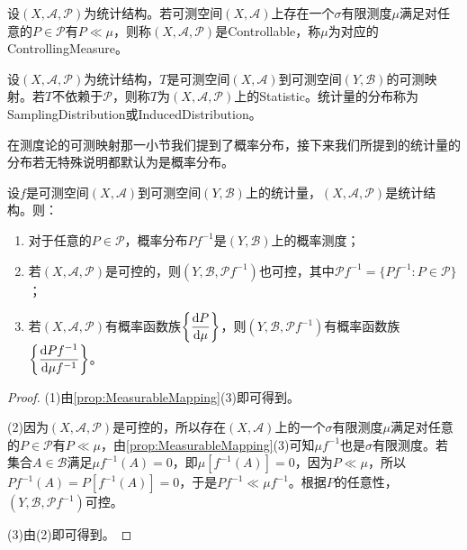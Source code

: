\begin{definition}
	设$(X,\mathscr{A},\mathscr{P})$为统计结构。若可测空间$(X,\mathscr{A})$上存在一个$\sigma$有限测度$\mu$满足对任意的$P\in\mathscr{P}$有$P\ll\mu$，则称$(X,\mathscr{A},\mathscr{P})$是\gls{Controllable}，称$\mu$为对应的\gls{ControllingMeasure}。
\end{definition}
\begin{definition}
	设$(X,\mathscr{A},\mathscr{P})$为统计结构，$T$是可测空间$(X,\mathscr{A})$到可测空间$(Y,\mathscr{B})$的可测映射。若$T$不依赖于$\mathscr{P}$，则称$T$为$(X,\mathscr{A},\mathscr{P})$上的\gls{Statistic}。统计量的分布称为\gls{SamplingDistribution}或\gls{InducedDistribution}。
\end{definition}
在测度论的可测映射那一小节我们提到了概率分布，接下来我们所提到的统计量的分布若无特殊说明都默认为是概率分布。
\begin{property}
	设$f$是可测空间$(X,\mathscr{A})$到可测空间$(Y,\mathscr{B})$上的统计量，$(X,\mathscr{A},\mathscr{P})$是统计结构。则：
	\begin{enumerate}
		\item 对于任意的$P\in\mathscr{P}$，概率分布$Pf^{-1}$是$(Y,\mathscr{B})$上的概率测度；
		\item 若$(X,\mathscr{A},\mathscr{P})$是可控的，则$(Y,\mathscr{B},\mathscr{P}f^{-1})$也可控，其中$\mathscr{P}f^{-1}=\{Pf^{-1}:P\in\mathscr{P}\}$；
		\item 若$(X,\mathscr{A},\mathscr{P})$有概率函数族$\left\{\dfrac{\mathop{}\!\mathrm{d} P}{\mathop{}\!\mathrm{d}\mu}\right\}$，则$(Y,\mathscr{B},\mathscr{P}f^{-1})$有概率函数族$\left\{\dfrac{\mathop{}\!\mathrm{d} Pf^{-1}}{\mathop{}\!\mathrm{d}\mu f^{-1}}\right\}$。
	\end{enumerate}
\end{property}
\begin{proof}
	(1)由\cref{prop:MeasurableMapping}(3)即可得到。\par
	(2)因为$(X,\mathscr{A},\mathscr{P})$是可控的，所以存在$(X,\mathscr{A})$上的一个$\sigma$有限测度$\mu$满足对任意的$P\in\mathscr{P}$有$P\ll\mu$，由\cref{prop:MeasurableMapping}(3)可知$\mu f^{-1}$也是$\sigma$有限测度。若集合$A\in\mathscr{B}$满足$\mu f^{-1}(A)=0$，即$\mu[f^{-1}(A)]=0$，因为$P\ll\mu$，所以$Pf^{-1}(A)=P[f^{-1}(A)]=0$，于是$Pf^{-1}\ll\mu f^{-1}$。根据$P$的任意性，$(Y,\mathscr{B},\mathscr{P}f^{-1})$可控。\par
	(3)由(2)即可得到。
\end{proof}

